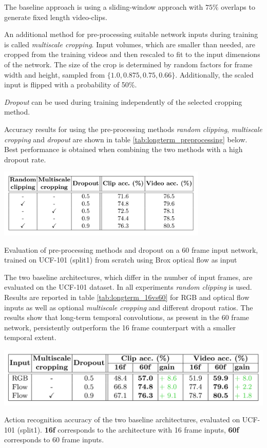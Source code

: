 The baseline approach is using a sliding-window approach with $75\%$ overlaps to generate fixed length video-clips.

An additional method for pre-processing suitable network inputs during training is called \textit{multiscale cropping}.
Input volumes, which are smaller than needed, are cropped from the training videos and then rescaled to fit to the input dimensions of the network.
The size of the crop is determined by random factors for frame width and height, sampled from $\{1.0, 0.875, 0.75, 0.66\}$.
Additionally, the scaled input is flipped with a probability of 50\%.

\textit{Dropout} \cite{srivastava_dropout:_2014} can be used during training independently of the selected cropping method.

Accuracy results for using the pre-processing methods \textit{random clipping}, \textit{multiscale cropping} and \textit{dropout} are shown in table \ref{tab:longterm_preprocessing} below.
Best performance is obtained when combining the two methods with a high dropout rate.
\begin{table}[H]
    \centering
    \includegraphics[width=0.75\textwidth]{img_deep/longterm_preprocessing}
    \caption{Evaluation of pre-processing methods and dropout on a 60 frame input network, trained on UCF-101 (split1) from scratch using Brox optical flow as input \cite{varol_long-term_2016}}
    \label{tab:longterm_preprocessing}
\end{table}

The two baseline architectures, which differ in the number of input frames, are evaluated on the UCF-101 dataset.
In all experiments \textit{random clipping} is used.
Results are reported in table \ref{tab:longterm_16vs60} for RGB and optical flow inputs as well as optional \textit{multiscale cropping} and different dropout ratios.
The results show that long-term temporal convolutions, as present in the 60 frame network, persistently outperform the 16 frame counterpart with a smaller temporal extent.

\begin{table}[H]
    \centering
    \includegraphics[width=\textwidth]{img_deep/longterm_16vs60}
    \caption{Action recognition accuracy of the two baseline architectures, evaluated on UCF-101 (split1). \textbf{16f} corresponds to the architecture with 16 frame inputs, \textbf{60f} corresponds to 60 frame inputs. \cite{varol_long-term_2016}}
    \label{tab:longterm_16vs60}
\end{table}

